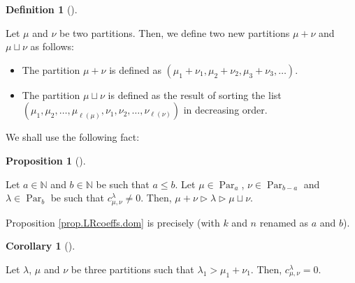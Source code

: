 \documentclass[numbers=enddot,12pt,final,onecolumn,notitlepage]{scrartcl}%
\theoremstyle{definition}
\newtheorem{prop}[theo]{Proposition}
\newenvironment{proposition}[1][]
{\begin{prop}[#1]\begin{leftbar}}
{\end{leftbar}\end{prop}}
\newtheorem{defi}[theo]{Definition}
\newenvironment{definition}[1][]
{\begin{defi}[#1]\begin{leftbar}}
{\end{leftbar}\end{defi}}
\newtheorem{coro}[theo]{Corollary}
\newenvironment{corollary}[1][]
{\begin{coro}[#1]\begin{leftbar}}
{\end{leftbar}\end{coro}}
\begin{document}
\begin{definition}
Let $\mu$ and $\nu$ be two partitions. Then, we define two new partitions
$\mu+\nu$ and $\mu\sqcup\nu$ as follows:

\begin{itemize}
\item The partition $\mu+\nu$ is defined as $\left(  \mu_{1}+\nu_{1},\mu
_{2}+\nu_{2},\mu_{3}+\nu_{3},\ldots\right)  $.

\item The partition $\mu\sqcup\nu$ is defined as the result of sorting the
list $\left(  \mu_{1},\mu_{2},\ldots,\mu_{\ell\left(  \mu\right)  },\nu
_{1},\nu_{2},\ldots,\nu_{\ell\left(  \nu\right)  }\right)  $ in decreasing order.
\end{itemize}
\end{definition}

We shall use the following fact:

\begin{proposition}
\label{prop.LRcoeffs.dom}Let $a\in\mathbb{N}$ and $b\in\mathbb{N}$ be such
that $a\leq b$. Let $\mu\in\operatorname*{Par}\nolimits_{a}$, $\nu
\in\operatorname*{Par}\nolimits_{b-a}$ and $\lambda\in\operatorname*{Par}%
\nolimits_{b}$ be such that $c_{\mu,\nu}^{\lambda}\neq0$. Then, $\mu
+\nu\triangleright\lambda\triangleright\mu\sqcup\nu$.
\end{proposition}

Proposition \ref{prop.LRcoeffs.dom} is precisely \cite[Exercise 2.9.17(c)]%
{GriRei18} (with $k$ and $n$ renamed as $a$ and $b$).

\begin{corollary}
\label{cor.LRcoeffs.dom0}Let $\lambda$, $\mu$ and $\nu$ be three partitions
such that $\lambda_{1}>\mu_{1}+\nu_{1}$. Then, $c_{\mu,\nu}^{\lambda}=0$.
\end{corollary}
\end{document}
